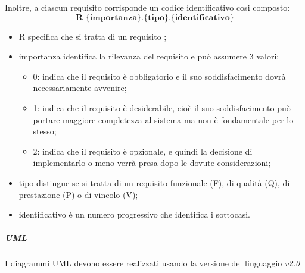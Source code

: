 Inoltre, a ciascun requisito corrisponde un codice identificativo cosi composto:
$$ \textbf{R \{importanza\}.\{tipo\}.\{identificativo\}  } $$
\begin{itemize}
	\item R specifica che si tratta di un requisito ;
	\item importanza identifica la rilevanza del requisito e può assumere 3 valori:
	\begin{itemize}
		\item 0: indica che il requisito è obbligatorio e il suo soddisfacimento dovrà necessariamente avvenire;
		\item 1: indica che il requisito è desiderabile, cioè il suo soddisfacimento può portare maggiore completezza al sistema ma non è fondamentale per lo stesso;
		\item 2: indica che il requisito è opzionale, e quindi la decisione di implementarlo o meno verrà presa dopo le dovute considerazioni;
	\end{itemize}
	\item tipo distingue se si tratta di un requisito funzionale (F), di qualità (Q), di prestazione (P) o di vincolo (V);
	\item identificativo è un numero progressivo che identifica i sottocasi.
\end{itemize}
\subparagraph{UML}\Spazio
I diagrammi UML devono essere realizzati usando la versione del linguaggio \emph{v2.0}
\pagebreak

